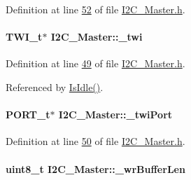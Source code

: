 Definition at line \hyperlink{_i2_c___master_8h_source_l00052}{52} of file \hyperlink{_i2_c___master_8h_source}{I2C\_\-Master.h}.

\hypertarget{class_i2_c___master_acec901e88e497316233e95427aad8109}{
\paragraph[{\_\-twi}]{\setlength{\rightskip}{0pt plus 5cm}TWI\_\-t$\ast$ {\bf I2C\_\-Master::\_\-twi}}\hfill}
\label{class_i2_c___master_acec901e88e497316233e95427aad8109}


Definition at line \hyperlink{_i2_c___master_8h_source_l00049}{49} of file \hyperlink{_i2_c___master_8h_source}{I2C\_\-Master.h}.



Referenced by \hyperlink{_i2_c___master_8h_source_l00153}{IsIdle()}.

\hypertarget{class_i2_c___master_aaafce0aec29b755962a0ea238dac3efc}{
\paragraph[{\_\-twiPort}]{\setlength{\rightskip}{0pt plus 5cm}PORT\_\-t$\ast$ {\bf I2C\_\-Master::\_\-twiPort}}\hfill}
\label{class_i2_c___master_aaafce0aec29b755962a0ea238dac3efc}


Definition at line \hyperlink{_i2_c___master_8h_source_l00050}{50} of file \hyperlink{_i2_c___master_8h_source}{I2C\_\-Master.h}.

\hypertarget{class_i2_c___master_adf3960dd4bcb3fa2079e08f14d307d23}{
\paragraph[{\_\-wrBufferLen}]{\setlength{\rightskip}{0pt plus 5cm}uint8\_\-t {\bf I2C\_\-Master::\_\-wrBufferLen}}\hfill}
\label{class_i2_c___master_adf3960dd4bcb3fa2079e08f14d307d23}


